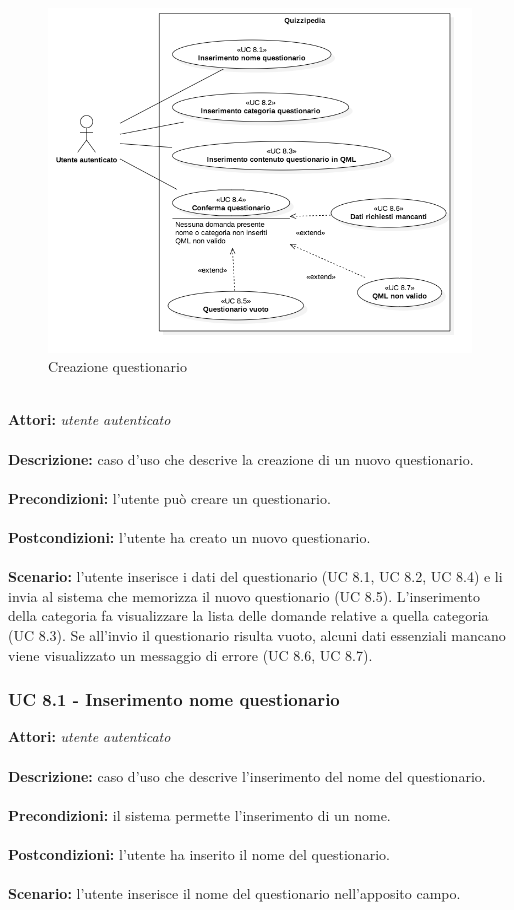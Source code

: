 \documentclass[a4paper,11pt]{article}
\begin{document}
\begin{figure}[h!]
\centering
\includegraphics[scale=0.6]{../immagini/UC8.png}
\caption{Creazione questionario}
\end{figure}
\ \\
\textbf{Attori:} \textit{utente autenticato}
\\ \\
\textbf{Descrizione:} caso d'uso che descrive la creazione di un nuovo questionario.\\
\\
\textbf{Precondizioni:} l'utente può creare un questionario.\\
\\
\textbf{Postcondizioni:} l’utente ha creato un nuovo questionario.\\
\\
\textbf{Scenario:} l’utente inserisce i dati del questionario (UC 8.1, UC 8.2, UC 8.4) e li invia al sistema che memorizza il nuovo questionario (UC 8.5). L'inserimento della categoria fa visualizzare la lista delle domande relative a quella categoria (UC 8.3). Se all'invio il questionario risulta vuoto, alcuni dati essenziali mancano viene visualizzato un messaggio di errore (UC 8.6, UC 8.7).\\


\subsubsection{UC 8.1 - Inserimento nome questionario}

\textbf{Attori:} \textit{utente autenticato}
\\ \\
\textbf{Descrizione:} caso d'uso che descrive l'inserimento del nome del questionario.\\
\\
\textbf{Precondizioni:} il sistema permette l'inserimento di un nome.\\
\\
\textbf{Postcondizioni:} l’utente ha inserito il nome del questionario.\\
\\
\textbf{Scenario:} l’utente inserisce il nome del questionario nell'apposito campo.\\
\end{document}
